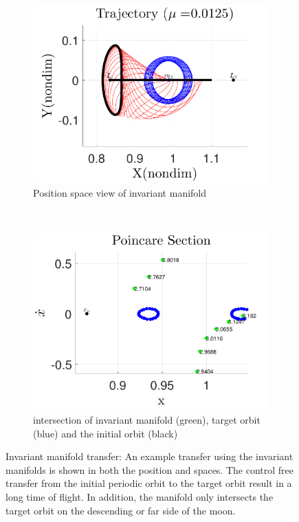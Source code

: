 \documentclass[smallcondensed]{svjour3}
\begin{document}
\begin{figure} 
        \centering 
        \begin{subfigure}[htbp]{0.5\textwidth} 
                \includegraphics[width=\textwidth]{manifold_trajectory} 
                \caption{Position space view of invariant manifold} \label{fig:manifold_trajectory} 
        \end{subfigure}~ %
        \begin{subfigure}[htbp]{0.5\textwidth} 
                \includegraphics[width=\textwidth]{manifold_poincare} 
                \caption{\Poincare intersection of invariant manifold (green), target orbit (blue) and the initial orbit (black)} \label{fig:manifold_poincare} 
        \end{subfigure} 
        \caption{Invariant manifold transfer: An example transfer using the invariant manifolds is shown in both the position and \Poincare spaces.
        The control free transfer from the initial periodic orbit to the target orbit result in a long time of flight. 
    In addition, the manifold only intersects the target orbit on the descending or far side of the moon.}
        \label{fig:invariant_manifold_transfer} 
\end{figure}
\end{document}
